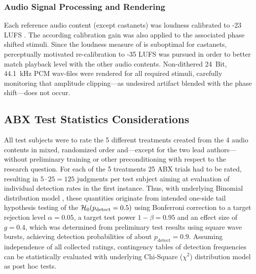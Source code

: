 %
%
%
\subsubsection{Audio Signal Processing and Rendering}
%
Each reference audio content (except castanets) was loudness
calibrated to -23 LUFS \cite{ITU1770}.
The according calibration gain was also applied to the associated phase shifted
stimuli.
%
Since the loudness measure of \cite{ITU1770} is suboptimal for castanets,
perceptually motivated re-calibration to -35 LUFS was pursued in order to better
match playback level with the other audio contents.
%
Non-dithered 24~Bit, 44.1~kHz PCM wav-files were rendered for all required stimuli,
carefully monitoring that amplitude clipping---as undesired artifact blended with
the phase shift---does not occur.
%
%
%
\subsection{ABX Test Statistics Considerations}
All test subjects were to rate the 5 different treatments created from the 4
audio contents in mixed, randomized order and---except for the two lead authors---%
without preliminary training or other preconditioning with respect to the research
question.
%
\NewL For each of the 5 treatments 25 ABX trials had to be rated, resulting
in $5\cdot 25=125$ judgments per test subject aiming at evaluation of
individual detection rates in the first instance.
%
Thus, with underlying Binomial distribution model
\cite{Howell2013, faul2007}, these quantities originate from
intended one-side tail hypothesis testing of the $\mathcal{H}_{0}(p_\text{detect}=0.5)$
using Bonferroni correction to a target
rejection level $\alpha=0.05$, a target test power $1-\beta=0.95$ and an
effect size of $g=0.4$, which was determined from
preliminary test results using square wave bursts, achieving detection
probabilities of about $p_\text{detect}=0.9$.
%
\NewL Assuming independence of all collected ratings, contingency tables of
detection frequencies can be statistically evaluated with underlying Chi-Square
($\chi^2$) distribution model as post hoc tests.
%
%
%
